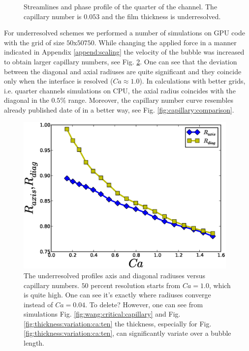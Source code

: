 \documentclass{article}
\begin{document}
\begin{figure}
\caption{Streamlines and phase profile of the quarter of the channel. The capillary number is
$0.053$ and the film thickness is underresolved. \label{fig:quarter:capillary:capillary01}}
\end{figure}
For underresolved schemes we performed a number of simulations on GPU code with the grid of size
$50\mathrm{x}50\mathrm{750}$. While changing the applied force in a manner indicated in Appendix
\ref{append:scaling} the velocity of the bubble was increased to obtain larger capillary numbers,
see Fig. \ref{fig:underresolved:capillaries}. One can see that the deviation between the diagonal
and axial radiuses are quite significant and they coincide only when the interface is resolved
($Ca\approx 1.0$). In calculations with better grids, i.e. quarter channels simulations on CPU, the
axial radius coincides with the diagonal in the $0.5\%$ range. Moreover, the capillary number curve
resembles already published date of \citet{heil-threedim} in a better way, see Fig.
\ref{fig:capillary:comparison}. 
\begin{figure}[ht]
\includegraphics[width=0.97\textwidth]{Figures/underresolved_capillaries.eps}
\caption{The underresolved profiles axis and diagonal radiuses versus capillary numbers. $50$
percent resolution starts from $Ca=1.0$, which is quite high. One can see it's exactly where
radiuses converge instead of $Ca=0.04$. {\color{red} To delete? However, one can see from
simulations Fig.
\ref{fig:wang:critical:capillary} and Fig.\ref{fig:thickness:variation:ca:ten} the thickness,
especially for Fig.\ref{fig:thickness:variation:ca:ten}, can significantly variate over a bubble
length.} \label{fig:underresolved:capillaries}}
\end{figure}
\end{document}
